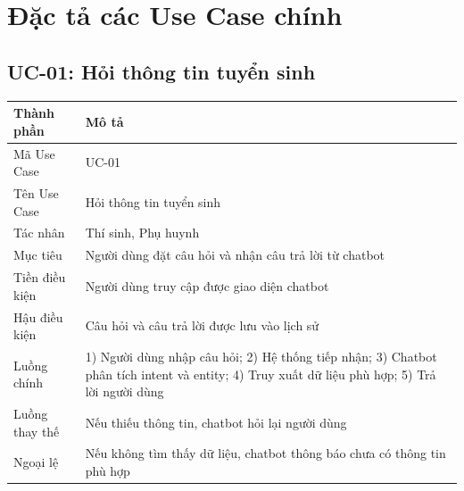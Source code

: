 \section{Đặc tả các Use Case chính}

\subsection{UC-01: Hỏi thông tin tuyển sinh}
\begin{table}[H]
\centering
\begin{tabular}{|p{3.5cm}|p{8.5cm}|}
\hline
\textbf{Thành phần} & \textbf{Mô tả} \\ \hline
Mã Use Case & UC-01 \\ \hline
Tên Use Case & Hỏi thông tin tuyển sinh \\ \hline
Tác nhân & Thí sinh, Phụ huynh \\ \hline
Mục tiêu & Người dùng đặt câu hỏi và nhận câu trả lời từ chatbot \\ \hline
Tiền điều kiện & Người dùng truy cập được giao diện chatbot \\ \hline
Hậu điều kiện & Câu hỏi và câu trả lời được lưu vào lịch sử \\ \hline
Luồng chính & 1) Người dùng nhập câu hỏi; 2) Hệ thống tiếp nhận; 3) Chatbot phân tích intent và entity; 4) Truy xuất dữ liệu phù hợp; 5) Trả lời người dùng \\ \hline
Luồng thay thế & Nếu thiếu thông tin, chatbot hỏi lại người dùng \\ \hline
Ngoại lệ & Nếu không tìm thấy dữ liệu, chatbot thông báo chưa có thông tin phù hợp \\ \hline
\end{tabular}
\end{table}

